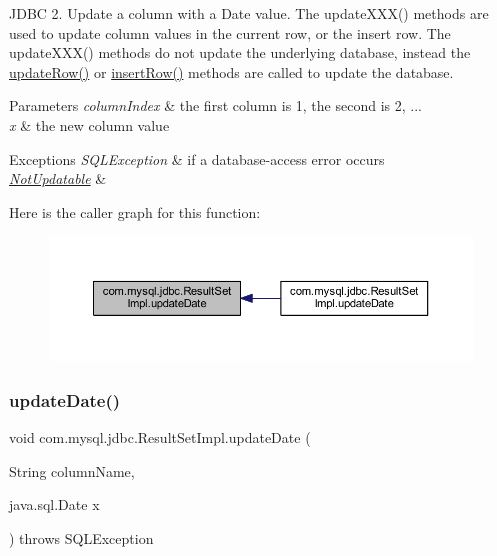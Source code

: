 J\+D\+BC 2. Update a column with a Date value. The update\+X\+X\+X() methods are used to update column values in the current row, or the insert row. The update\+X\+X\+X() methods do not update the underlying database, instead the \mbox{\hyperlink{classcom_1_1mysql_1_1jdbc_1_1_result_set_impl_a2842d32292d023aaeeafedeed3322981}{update\+Row()}} or \mbox{\hyperlink{classcom_1_1mysql_1_1jdbc_1_1_result_set_impl_a78e304e3279cbcf60392f18c1385e3bf}{insert\+Row()}} methods are called to update the database.


\begin{DoxyParams}{Parameters}
{\em column\+Index} & the first column is 1, the second is 2, ... \\
\hline
{\em x} & the new column value\\
\hline
\end{DoxyParams}

\begin{DoxyExceptions}{Exceptions}
{\em S\+Q\+L\+Exception} & if a database-\/access error occurs \\
\hline
{\em \mbox{\hyperlink{classcom_1_1mysql_1_1jdbc_1_1_not_updatable}{Not\+Updatable}}} & \\
\hline
\end{DoxyExceptions}
Here is the caller graph for this function\+:
\nopagebreak
\begin{figure}[H]
\begin{center}
\leavevmode
\includegraphics[width=350pt]{classcom_1_1mysql_1_1jdbc_1_1_result_set_impl_a4411849c1033b786838cd008e7ecd76e_icgraph}
\end{center}
\end{figure}
\mbox{\label{classcom_1_1mysql_1_1jdbc_1_1_result_set_impl_a39ed44af35f25e15d4d5657663301cfb}} 
\subsubsection{\texorpdfstring{update\+Date()}{updateDate()}\hspace{0.1cm}{\footnotesize\ttfamily [2/2]}}
{\footnotesize\ttfamily void com.\+mysql.\+jdbc.\+Result\+Set\+Impl.\+update\+Date (\begin{DoxyParamCaption}\item[{String}]{column\+Name,  }\item[{java.\+sql.\+Date}]{x }\end{DoxyParamCaption}) throws S\+Q\+L\+Exception}


